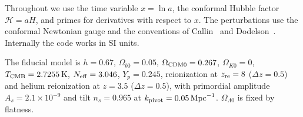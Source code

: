 \documentclass[aps,prd,twocolumn,nofootinbib,superscriptaddress,floatfix]{revtex4-2}
\newcommand{\Hp}{\mathcal{H}}
\newcommand{\Mpc}{\,\mathrm{Mpc}}
\newcommand{\Om}{\Omega}
\begin{document}
Throughout we use the time variable $x=\ln a$, the conformal Hubble factor $\Hp=aH$, and primes for derivatives with
respect to $x$. The perturbations use the conformal Newtonian gauge and the conventions of
Callin~\cite{Callin2006} and Dodelson~\cite{Dodelson2003}. Internally the code works in SI units.

The fiducial model is $h=0.67$, $\Om_{b0}=0.05$, $\Om_{\rm CDM0}=0.267$, $\Om_{K0}=0$, $T_{\rm CMB}=2.7255$\,K,
$N_{\rm eff}=3.046$, $Y_p=0.245$, reionization at $z_{\rm re}=8$ ($\Delta z=0.5$) and helium reionization at
$z=3.5$ ($\Delta z=0.5$), with primordial amplitude $A_s=2.1\times10^{-9}$ and tilt $n_s=0.965$ at
$k_{\rm pivot}=0.05\Mpc^{-1}$. $\Om_{\Lambda0}$ is fixed by flatness.














\end{document}
